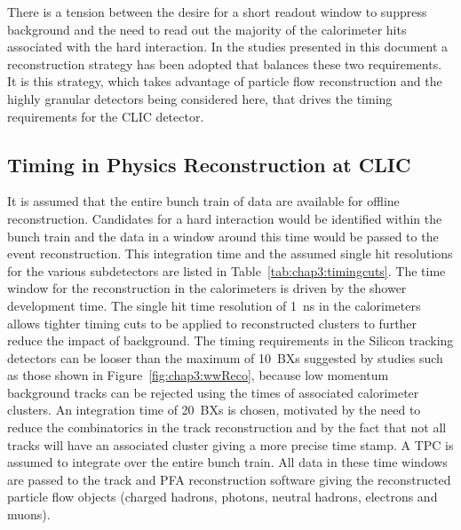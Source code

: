 There is a tension between the desire for a short readout window to suppress background
and the need to read out the majority of the calorimeter hits associated with
the hard interaction. In the studies presented in this document a reconstruction
strategy has been adopted that balances these two requirements. It is this strategy,
which takes advantage of particle flow reconstruction and the highly granular
detectors being considered here, that drives the timing requirements for the CLIC detector.

\subsection{Timing in Physics Reconstruction at CLIC\label{sec:chapter3:clic_detector:physicsReconstruction}}

It is assumed that the entire bunch train of data are available for offline
reconstruction. Candidates for a hard interaction would be identified within the
bunch train and the data in a window around this time would be passed to the
event reconstruction. This integration time and the assumed single hit
resolutions for the various subdetectors are listed in
Table~\ref{tab:chap3:timingcuts}. The time window for the reconstruction in the 
calorimeters is driven by the shower development time. The single hit time
resolution of 1~ns in the calorimeters allows tighter timing cuts to be
applied to reconstructed clusters to further reduce the impact of background.
The timing requirements in the Silicon tracking detectors can be looser than the
maximum of 10~BXs suggested by studies such as those shown in
Figure~\ref{fig:chap3:wwReco}, because low momentum background tracks can be
rejected using the times of associated calorimeter clusters. An integration time
of 20~BXs is chosen, motivated by the need to reduce the combinatorics in the
track reconstruction and by the fact that not all tracks will have an associated
cluster giving a more precise time stamp. A \acs{TPC} is assumed to integrate over
the entire bunch train. All data in these time windows are passed to the track
and \acs{PFA} reconstruction software giving the reconstructed particle flow
objects (charged hadrons, photons, neutral hadrons, electrons and muons). 
